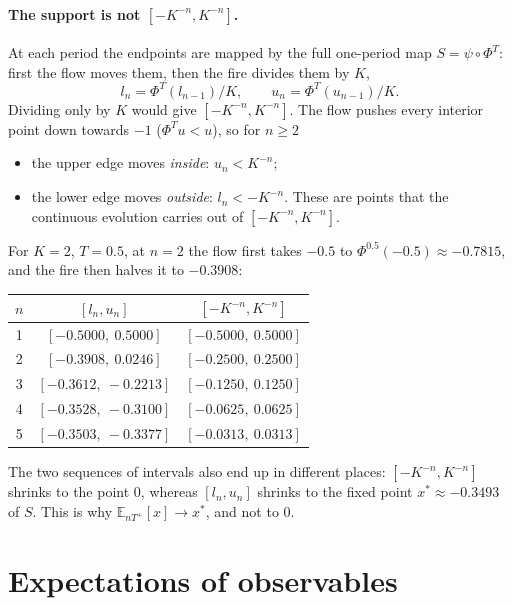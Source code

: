 \documentclass[11pt,a4paper]{article}
\theoremstyle{remark}
\newcommand{\E}{\mathbb{E}}
\begin{document}
\paragraph{The support is not $[-K^{-n},K^{-n}]$.}
At each period the endpoints are mapped by the full one-period map
$S=\psi\circ\Phi^T$: first the flow moves them, then the fire divides them by
$K$,
\begin{equation}
  l_n = \Phi^T(l_{n-1})/K,\qquad u_n=\Phi^T(u_{n-1})/K .
\end{equation}
Dividing only by $K$ would give $[-K^{-n},K^{-n}]$. The flow pushes every
interior point down towards $-1$ ($\Phi^T u<u$), so for $n\ge2$
\begin{itemize}
\item the upper edge moves \emph{inside}: $u_n<K^{-n}$;
\item the lower edge moves \emph{outside}: $l_n<-K^{-n}$. These are points
  that the continuous evolution carries out of $[-K^{-n},K^{-n}]$.
\end{itemize}
For $K=2$, $T=0.5$, at $n=2$ the flow first takes $-0.5$ to
$\Phi^{0.5}(-0.5)\approx-0.7815$, and the fire then halves it to $-0.3908$:
\begin{center}
\begin{tabular}{ccc}
\toprule
$n$ & $[l_n,u_n]$ & $[-K^{-n},K^{-n}]$\\
\midrule
1 & $[-0.5000,\ 0.5000]$ & $[-0.5000,\ 0.5000]$\\
2 & $[-0.3908,\ 0.0246]$ & $[-0.2500,\ 0.2500]$\\
3 & $[-0.3612,\ -0.2213]$ & $[-0.1250,\ 0.1250]$\\
4 & $[-0.3528,\ -0.3100]$ & $[-0.0625,\ 0.0625]$\\
5 & $[-0.3503,\ -0.3377]$ & $[-0.0313,\ 0.0313]$\\
\bottomrule
\end{tabular}
\end{center}
The two sequences of intervals also end up in different places:
$[-K^{-n},K^{-n}]$ shrinks to the point $0$, whereas $[l_n,u_n]$ shrinks to
the fixed point $x^*\approx-0.3493$ of $S$. This is why
$\E_{nT^+}[x]\to x^*$, and not to $0$.

\section{Expectations of observables}
\end{document}
